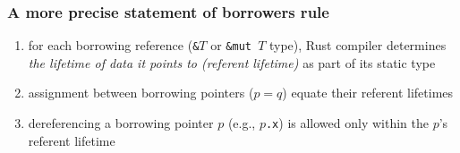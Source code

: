\documentclass[12pt,dvipdfmx]{beamer}
\newcommand{\ao}[1]{{\color{blue}#1}}
\begin{document}
\begin{frame}[fragile]
  \frametitle{A more precise statement of borrowers rule}
  \begin{enumerate}
  \item<1-> for each borrowing reference ({\tt \&$T$} or {\tt \&mut $T$} type),
    Rust compiler
    determines {\it the lifetime of data it points to \ao{(referent lifetime)}}
    as part of its static type
  \item<2-> assignment between borrowing pointers ($p = q$) 
    equate their referent lifetimes 
  \item<5-> dereferencing a borrowing pointer $p$ (e.g., {\tt $p$.x})
    is allowed only within the $p$'s referent lifetime
  \end{enumerate}

  

\end{frame}
\end{document}
